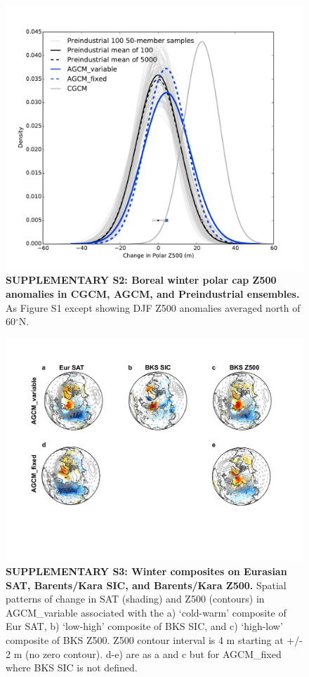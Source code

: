 \documentclass{nature}
\begin{document}
\begin{figure}%
\centering
\noindent\includegraphics[width=29pc]{Word/SuppFigure_2_polarcapz500.pdf}
\caption{\textbf{SUPPLEMENTARY S2: Boreal winter polar cap Z500 anomalies in CGCM, AGCM, and Preindustrial ensembles.} As Figure S1 except showing DJF Z500 anomalies averaged north of 60$^\circ$N.
}
\label{fig:supp1} 
\end{figure}


\begin{figure}%
\centering
\noindent\includegraphics[width=39pc]{Word/SuppFig_xx.pdf}
\caption{\textbf{SUPPLEMENTARY S3: Winter composites on Eurasian SAT, Barents/Kara SIC, and Barents/Kara Z500.}  Spatial patterns of change in SAT (shading) and Z500 (contours) in AGCM\_variable associated with the a) `cold-warm' composite of Eur SAT, b) `low-high' composite of BKS SIC, and c) `high-low' composite of BKS Z500. Z500 contour interval is 4 m starting at +/- 2 m (no zero contour). d-e) are as a and c but for AGCM\_fixed where BKS SIC is not defined. %
} 
\label{fig:supp3} 
\end{figure}
\end{document}

